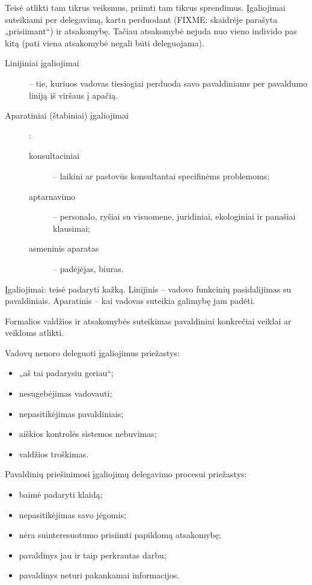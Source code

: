 \begin{defn}[Įgaliojimai]
  Teisė atlikti tam tikrus veiksmus, priimti tam tikrus sprendimus.
  Įgaliojimai suteikiami per delegavimą, kartu perduodant (FIXME:
  skaidrėje parašyta „prisiimant“) ir atsakomybę. Tačiau atsakomybė
  nejuda nuo vieno individo pas kitą (pati viena atsakomybė negali
  būti deleguojama).

  \begin{description}
    \item[Linijiniai įgaliojimai] – tie, kuriuos vadovas tiesiogiai
      perduoda savo pavaldiniams per pavaldumo liniją iš viršaus į
      apačią.
    \item[Aparatiniai (štabiniai) įgaliojimai]:
      \begin{description}
        \item[konsultaciniai] – laikini ar pastovūs konsultantai
          specifinėms problemoms;
        \item[aptarnavimo] – personalo, ryšiai su visuomene, juridiniai,
          ekologiniai ir panašiai klausimai;
        \item[asmeninis aparatas] – padėjėjas, biuras.
      \end{description}
  \end{description}
\end{defn}

Įgaliojimai: teisė padaryti kažką. Linijinis – vadovo funkcinių 
pasidalijimas su pavaldiniais. Aparatinis – kai vadovas suteikia
galimybę jam padėti.

\begin{defn}[Delegavimas]
  Formalios valdžios ir atsakomybės suteikimas pavaldiniui konkrečiai
  veiklai ar veikloms atlikti.
\end{defn}

Vadovų nenoro deleguoti įgaliojimus priežastys:
\begin{itemize}
  \item „aš tai padarysiu geriau“;
  \item nesugebėjimas vadovauti;
  \item nepasitikėjimas pavaldiniais;
  \item aiškios kontrolės sistemos nebuvimas;
  \item valdžios troškimas.
\end{itemize}

Pavaldinių priešinimosi įgaliojimų delegavimo procesui priežastys:
\begin{itemize}
  \item baimė padaryti klaidą;
  \item nepasitikėjimas savo jėgomis;
  \item nėra suinteresuotumo prisiimti papildomą atsakomybę;
  \item pavaldinys jau ir taip perkrautas darbu;
  \item pavaldinys neturi pakankamai informacijos.
\end{itemize}

